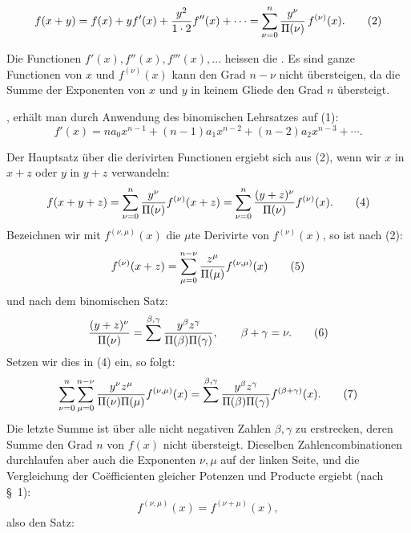 
\begin{equation}
 f(x+y)=f(x)+yf'(x)+{y^2\over1\cdot2}f''(x)+\cdots
       =\sum_{\nu=0}^{n}{y^\nu\over\Pi(\nu)}\,f^{(\nu)}(x).
\tag{2}
\end{equation}

Die Functionen $f'(x),f''(x),f'''(x),\ldots$ heissen die . Es sind ganze Functionen von $x$ und $f^{(\nu)}(x)$ kann den Grad $n-\nu$ nicht übersteigen, da die Summe der Exponenten von $x$ und $y$ in keinem Gliede den Grad $n$ übersteigt.

, erhält man durch Anwendung des binomischen Lehrsatzes auf (1):
\begin{equation}
 f'(x)=na_0x^{n-1}+(n-1)a_1x^{n-2}+(n-2)a_2x^{n-3}+\cdots .
\tag{3}
\end{equation}

Der Hauptsatz über die derivirten Functionen ergiebt sich aus (2), wenn wir $x$ in $x+z$ oder $y$ in $y+z$ verwandeln:
\begin{equation}
 f(x+y+z)=\sum_{\nu=0}^{n}{y^\nu\over\Pi(\nu)}f^{(\nu)}(x+z)
 =\sum_{\nu=0}^{n}{(y+z)^\nu\over\Pi(\nu)}f^{(\nu)}(x).
\tag{4}
\end{equation}
Bezeichnen wir mit $f^{(\nu,\mu)}(x)$ die $\mu$te Derivirte von $f^{(\nu)}(x)$, so ist nach (2):
\begin{equation}
 f^{(\nu)}(x+z)=\sum_{\mu=0}^{n-\nu}{z^\mu\over\Pi(\mu)}f^{(\nu,\mu)}(x)
\tag{5}
\end{equation}
und nach dem binomischen Satz:
\begin{equation}
 { (y+z)^\nu\over\Pi(\nu)}
 =\sum^{\beta,\gamma}{y^\beta z^\gamma\over\Pi(\beta)\Pi(\gamma)},
 \qquad \beta+\gamma=\nu.
\tag{6}
\end{equation}
Setzen wir dies in (4) ein, so folgt:
\begin{equation}
 \sum_{\nu=0}^{n}\sum_{\mu=0}^{n-\nu}
 {y^\nu z^\mu\over\Pi(\nu)\Pi(\mu)}f^{(\nu,\mu)}(x)
 =
 \sum^{\beta,\gamma}
 {y^\beta z^\gamma\over\Pi(\beta)\Pi(\gamma)}f^{(\beta+\gamma)}(x).
\tag{7}
\end{equation}
Die letzte Summe ist über alle nicht negativen Zahlen $\beta,\gamma$ zu erstrecken, deren Summe den Grad $n$ von $f(x)$ nicht übersteigt. Dieselben Zahlencombinationen durchlaufen aber auch die Exponenten $\nu,\mu$ auf der linken Seite, und die Vergleichung der Coëfficienten gleicher Potenzen und Producte ergiebt (nach \S~1):
\begin{equation}
 f^{(\nu,\mu)}(x)=f^{(\nu+\mu)}(x),
\tag{8}
\end{equation}
also den Satz:
